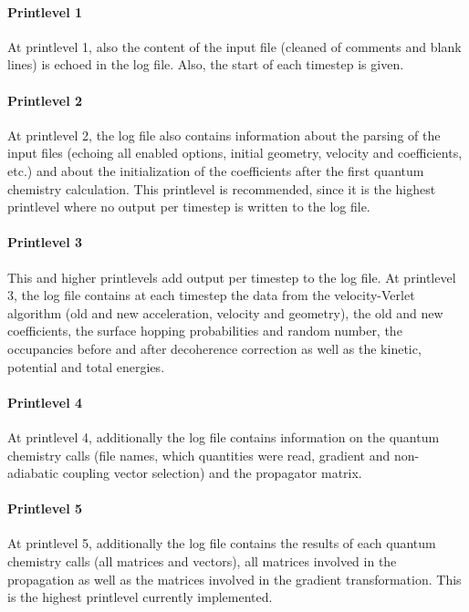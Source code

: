 \documentclass[a4paper,11pt,DIV=15,openany,twoside=false]{scrbook}
\begin{document}
\paragraph{Printlevel 1}

At printlevel 1, also the content of the input file (cleaned of comments and blank lines) is echoed in the log file. Also, the start of each timestep is given.

\paragraph{Printlevel 2}

At printlevel 2, the log file also contains information about the parsing of the input files (echoing all enabled options, initial geometry, velocity and coefficients, etc.) and about the initialization of the coefficients after the first quantum chemistry calculation. This printlevel is recommended, since it is the highest printlevel where no output per timestep is written to the log file.

\paragraph{Printlevel 3}

This and higher printlevels add output per timestep to the log file. At printlevel 3, the log file contains at each timestep the data from the velocity-Verlet algorithm (old and new acceleration, velocity and geometry), the old and new coefficients, the surface hopping probabilities and random number, the occupancies before and after decoherence correction as well as the kinetic, potential and total energies.

\paragraph{Printlevel 4}

At printlevel 4, additionally the log file contains information on the quantum chemistry calls (file names, which quantities were read, gradient and non-adiabatic coupling vector selection) and the propagator matrix.

\paragraph{Printlevel 5}

At printlevel 5, additionally the log file contains the results of each quantum chemistry calls (all matrices and vectors), all matrices involved in the propagation as well as the matrices involved in the gradient transformation. This is the highest printlevel currently implemented.
\end{document}
